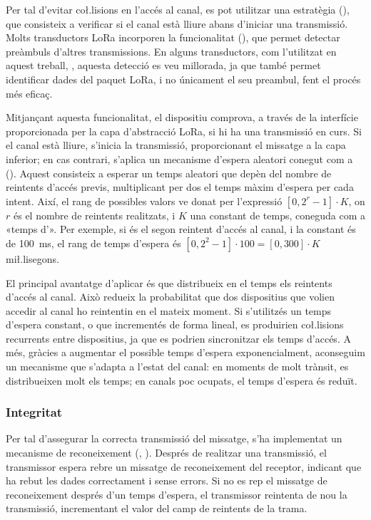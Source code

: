 \documentclass{tfgitic}[2024/07/01]
\begin{document}
Per tal d’evitar co\l.lisions en l’accés al canal, es pot utilitzar una estratègia  (), que consisteix a verificar si el canal està lliure abans d’iniciar una transmissió. Molts transductors LoRa incorporen la funcionalitat  (), que permet detectar preàmbuls d'altres transmissions. En alguns transductors, com l'utilitzat en aquest treball, , aquesta detecció es veu millorada, ja que també permet identificar dades del paquet LoRa, i no únicament el seu preambul, fent el procés més eficaç.

Mitjançant aquesta funcionalitat, el dispositiu comprova, a través de la interfície proporcionada per la capa d'abstracció LoRa, si hi ha una transmissió en curs. Si el canal està lliure, s'inicia la transmissió, proporcionant el missatge a la capa inferior; en cas contrari, s'aplica un mecanisme d'espera aleatori conegut com a  (). Aquest consisteix a esperar un temps aleatori que depèn del nombre de reintents d'accés previs, multiplicant per dos el temps màxim d'espera per cada intent. Així, el rang de possibles valors ve donat per l'expressió $[0, 2^r-1]\cdot K$, on ${r}$ és el nombre de reintents realitzats, i ${K}$ una constant de temps, coneguda com a  «temps d'». Per exemple, si és el segon reintent d'accés al canal, i la constant és de \SI{100}{\milli\second}, el rang de temps d'espera és $[0, 2^2-1]\cdot100=[0, 300]\cdot K$ mi\l.lisegons. 

El principal avantatge d'aplicar  és que distribueix en el temps els reintents d'accés al canal. Això redueix la probabilitat que dos dispositius que volien accedir al canal ho reintentin en el mateix moment. Si s'utilitzés un temps d'espera constant, o que incrementés de forma lineal, es produirien co\l.lisions recurrents entre dispositius, ja que es podrien sincronitzar els temps d'accés. A més, gràcies a augmentar el possible temps d'espera exponencialment, aconseguim un mecanisme que s'adapta a l'estat del canal: en moments de molt trànsit, es distribueixen molt els temps; en canals poc ocupats, el temps d'espera és reduït.
\subsubsection{Integritat}
\label{subsubsec:integritat}
Per tal d'assegurar la correcta transmissió del missatge, s'ha implementat un mecanisme de reconeixement (, ). Després de realitzar una transmissió, el transmissor espera rebre un missatge de reconeixement del receptor, indicant que ha rebut les dades correctament i sense errors. Si no es rep el missatge de reconeixement després d'un temps d'espera, el transmissor reintenta de nou la transmissió, incrementant el valor del camp de reintents de la trama.
\end{document}
